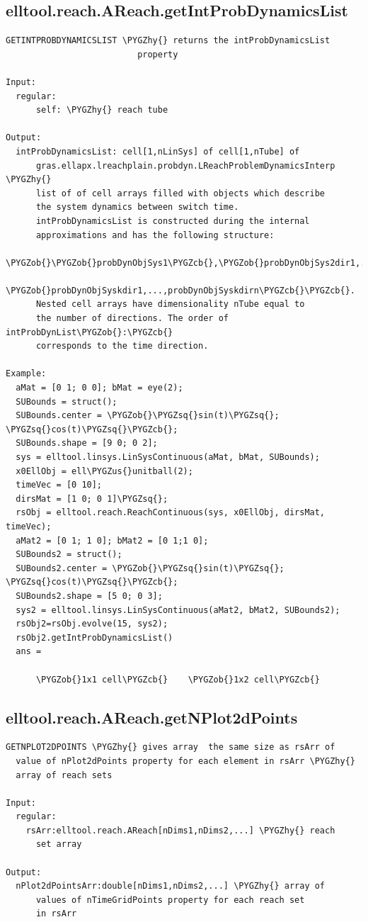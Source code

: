 \documentclass[letterpaper,10pt,english]{sphinxmanual}
\def\PYGZus{\char`\_}
\def\PYGZob{\char`\{}
\def\PYGZcb{\char`\}}
\def\PYGZhy{\char`\-}
\def\PYGZsq{\char`\'}
\begin{document}
\subsection{elltool.reach.AReach.getIntProbDynamicsList}
\label{chap_functions:elltool-reach-areach-getintprobdynamicslist}
\begin{Verbatim}[commandchars=\\\{\}]
GETINTPROBDYNAMICSLIST \PYGZhy{} returns the intProbDynamicsList
                          property

Input:
  regular:
      self: \PYGZhy{} reach tube

Output:
  intProbDynamicsList: cell[1,nLinSys] of cell[1,nTube] of
      gras.ellapx.lreachplain.probdyn.LReachProblemDynamicsInterp \PYGZhy{}
      list of of cell arrays filled with objects which describe
      the system dynamics between switch time.
      intProbDynamicsList is constructed during the internal
      approximations and has the following structure:
      \PYGZob{}\PYGZob{}probDynObjSys1\PYGZcb{},\PYGZob{}probDynObjSys2dir1,...,probDynObjSys2dirn\PYGZcb{},...,
      \PYGZob{}probDynObjSyskdir1,...,probDynObjSyskdirn\PYGZcb{}\PYGZcb{}.
      Nested cell arrays have dimensionality nTube equal to
      the number of directions. The order of intProbDynList\PYGZob{}:\PYGZcb{}
      corresponds to the time direction.

Example:
  aMat = [0 1; 0 0]; bMat = eye(2);
  SUBounds = struct();
  SUBounds.center = \PYGZob{}\PYGZsq{}sin(t)\PYGZsq{}; \PYGZsq{}cos(t)\PYGZsq{}\PYGZcb{};
  SUBounds.shape = [9 0; 0 2];
  sys = elltool.linsys.LinSysContinuous(aMat, bMat, SUBounds);
  x0EllObj = ell\PYGZus{}unitball(2);
  timeVec = [0 10];
  dirsMat = [1 0; 0 1]\PYGZsq{};
  rsObj = elltool.reach.ReachContinuous(sys, x0EllObj, dirsMat, timeVec);
  aMat2 = [0 1; 1 0]; bMat2 = [0 1;1 0];
  SUBounds2 = struct();
  SUBounds2.center = \PYGZob{}\PYGZsq{}sin(t)\PYGZsq{}; \PYGZsq{}cos(t)\PYGZsq{}\PYGZcb{};
  SUBounds2.shape = [5 0; 0 3];
  sys2 = elltool.linsys.LinSysContinuous(aMat2, bMat2, SUBounds2);
  rsObj2=rsObj.evolve(15, sys2);
  rsObj2.getIntProbDynamicsList()
  ans =

      \PYGZob{}1x1 cell\PYGZcb{}    \PYGZob{}1x2 cell\PYGZcb{}
\end{Verbatim}


\subsection{elltool.reach.AReach.getNPlot2dPoints}
\label{chap_functions:elltool-reach-areach-getnplot2dpoints}
\begin{Verbatim}[commandchars=\\\{\}]
GETNPLOT2DPOINTS \PYGZhy{} gives array  the same size as rsArr of
  value of nPlot2dPoints property for each element in rsArr \PYGZhy{}
  array of reach sets

Input:
  regular:
    rsArr:elltool.reach.AReach[nDims1,nDims2,...] \PYGZhy{} reach
      set array

Output:
  nPlot2dPointsArr:double[nDims1,nDims2,...] \PYGZhy{} array of
      values of nTimeGridPoints property for each reach set
      in rsArr
\end{Verbatim}
\end{document}
